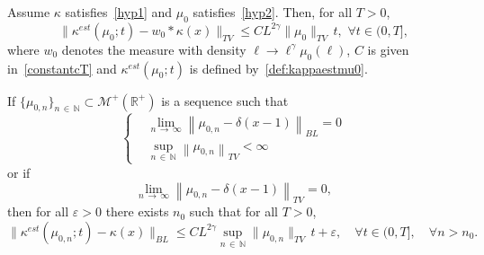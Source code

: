 \documentclass[AHL,Unicode,longabstracts,published]{cedram}
\newcommand*\R{\mathbb{R}}
\newcommand*\M{\mathcal{M}}
\newcommand*\N{\mathbb{N}}
\let\oldforall\forall
\renewcommand*{\forall}{\mathrel{\oldforall}}
\begin{document}
\begin{coro}\label{cor:generic}
Assume $\kappa$ satisfies~\eqref{hyp1} and $\mu_0$
satisfies~\eqref{hyp2}.
 Then, for all $T>0$,
\begin{equation}\label{cor:generic1}
\Big\|{\kappa^{est}(\mu _0; t)}-w_0\ast\kappa(x)\Big\|_{TV} \leq CL^{2\gamma }\|\mu_0\|_{TV}\, t,\,\,\forall t\in (0, T],
\end{equation}
where $w_0$ denotes the measure with density $\ell \to \ell^{\gamma}\mu _0(\ell)$, $C$ is given in~\eqref{constantcT} and $\kappa^{est}(\mu_0;t)$ is defined by~\eqref{def:kappaestmu0}.

If $\{\mu _{ 0, n }\}_{n\,\in\,\N}\subset \M^+(\R^+)$ is a sequence such that
\begin{equation}\label{mcd1}
\begin{cases}
&\lim_{n\,\to\,\infty}\left\|\mu _{0, n}-\delta (x-1)\right\|_{BL}=0\\
&\sup_{n\,\in\,\N}\left\|\mu _{0, n}\right\|_{TV}<\infty
\end{cases}
\end{equation}
or if
\begin{equation}\label{mcd2}
\lim _{n\,\to\,\infty}\left\|\mu _{0, n}-\delta (x-1)\right\|_{TV}=0,
\end{equation}
then for all $\varepsilon >0$ there exists $n_0$ such that for all $T>0$,
\begin{equation}\label{cor:generic2}
\Big\|{\kappa^{est}(\mu _{ 0, n }; t)}- \kappa(x)\Big\|_{BL} \leq CL^{2\gamma}
\sup_{n\,\in\,\N}\|\mu _{0, n}\|_{TV}\,t+\varepsilon,\quad\forall t\in (0, T],\quad \forall n>n_0.
\end{equation}

\end{coro}
\end{document}
